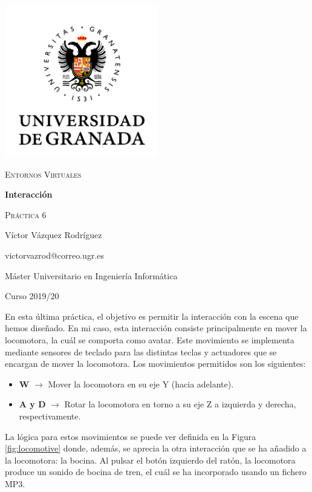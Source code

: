 \documentclass{article}
\begin{document}
\begin{titlepage}
    \centering
    \includegraphics[width=0.5\textwidth]{images/logo-ugr.png}\par
    \vspace{1cm}
    {\Large\scshape Entornos Virtuales \par}
    {\huge\bfseries Interacción \par}
    \vspace{0.2cm}
    {\scshape Práctica 6 \par}
    \vfill
    {\large Víctor Vázquez Rodríguez  \par}
    {victorvazrod@correo.ugr.es \par}
    \vfill
    {\large Máster Universitario en Ingeniería Informática \par}
    \vspace{0.2cm}
    {Curso 2019/20 \par}
\end{titlepage}

En esta última práctica, el objetivo es permitir la interacción con la escena
que hemos diseñado. En mi caso, esta interacción consiste principalmente en
mover la locomotora, la cuál se comporta como avatar. Este movimiento se
implementa mediante sensores de teclado para las distintas teclas y actuadores
que se encargan de mover la locomotora. Los movimientos permitidos son los
siguientes:

\begin{itemize}
    \item \textbf{W} $\rightarrow$ Mover la locomotora en su eje Y (hacia
          adelante).
    \item \textbf{A y D} $\rightarrow$ Rotar la locomotora en torno a su eje Z a
          izquierda y derecha, respectivamente.
\end{itemize}

La lógica para estos movimientos se puede ver definida en la Figura
\ref{fig:locomotive} donde, además, se aprecia la otra interacción que se ha
añadido a la locomotora: la bocina. Al pulsar el botón izquierdo del ratón, la
locomotora produce un sonido de bocina de tren, el cuál se ha incorporado usando
un fichero MP3.
\end{document}
